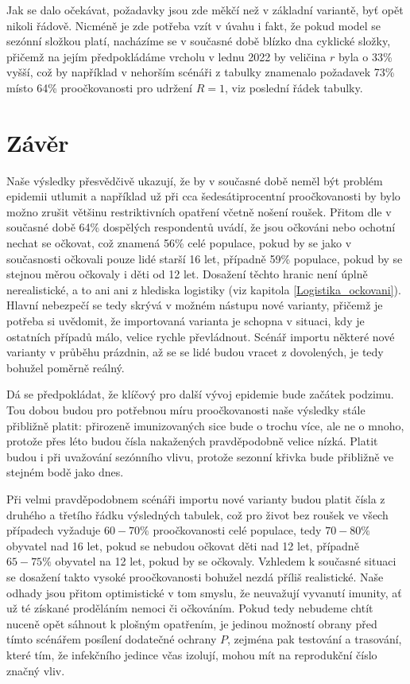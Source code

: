 Jak se dalo očekávat, požadavky jsou zde měkčí než v základní variantě,
byť opět nikoli řádově. Nicméně je zde potřeba vzít v úvahu i fakt, že  pokud model se sezónní složkou platí, nacházíme se v současné době blízko dna cyklické složky, přičemž na jejím předpokládáme
vrcholu v lednu 2022 by veličina $r$ byla o 33\% vyšší, což by například
v nehorším scénáři z tabulky znamenalo požadavek 73\% místo 64\% proočkovanosti
pro udržení $R=1$, viz poslední řádek tabulky.

\section*{Závěr}

Naše výsledky přesvědčivě ukazují, že by v současné době neměl být problém epidemii
utlumit a například už při cca šedesátiprocentní proočkovanosti
by bylo možno zrušit většinu restriktivních opatření včetně nošení roušek. Přitom dle \cite{paqcovid}  v současné době 64\% dospělých respondentů uvádí, že jsou očkováni nebo ochotní nechat se očkovat, což znamená 56\% celé populace, pokud by se jako v současnosti očkovali pouze lidé starší 16 let, případně 59\% populace, pokud by se stejnou měrou očkovaly i děti od 12 let. Dosažení těchto hranic není úplně nerealistické, a to ani
ani z hlediska logistiky (viz kapitola \ref{Logistika_ockovani}). Hlavní nebezpečí se tedy
skrývá v možném nástupu nové varianty, přičemž je potřeba si uvědomit,
že importovaná varianta je schopna v situaci, kdy je ostatních
případů málo, velice rychle převládnout. Scénář importu některé
nové varianty v průběhu prázdnin, až se se lidé budou vracet z dovolených, je
tedy bohužel poměrně reálný.

Dá se předpokládat, že klíčový pro další vývoj epidemie bude začátek podzimu. Tou dobou budou pro potřebnou míru proočkovanosti naše výsledky stále přibližně platit: přirozeně imunizovaných sice bude o trochu více, ale ne o mnoho, protože přes léto budou čísla nakažených pravděpodobně velice nízká. Platit budou i při uvažování sezónního vlivu, protože sezonní křivka bude přibližně ve stejném bodě jako dnes. 

Při velmi pravděpodobnem scénáři importu nové varianty budou platit čísla z druhého a třetího řádku výsledných tabulek, což pro život bez roušek ve všech případech vyžaduje $60-70\%$ proočkovanosti celé populace, tedy $70-80\%$ obyvatel nad 16 let, pokud se nebudou očkovat děti nad 12 let, případně $65-75 \%$ obyvatel na 12 let, pokud by se očkovaly. Vzhledem k současné situaci se dosažení takto vysoké proočkovanosti bohužel nezdá příliš realistické. Naše odhady jsou přitom optimistické v tom smyslu, že neuvažují vyvanutí imunity, ať už té získané proděláním nemoci či očkováním.
Pokud tedy nebudeme chtít nuceně  opět sáhnout k plošným
opatřením, je jedinou možností obrany před tímto scénářem posílení
dodatečné ochrany $P$, zejména pak testování a trasování, které tím, že
infekčního jedince včas izolují, mohou mít na reprodukční číslo značný
vliv.